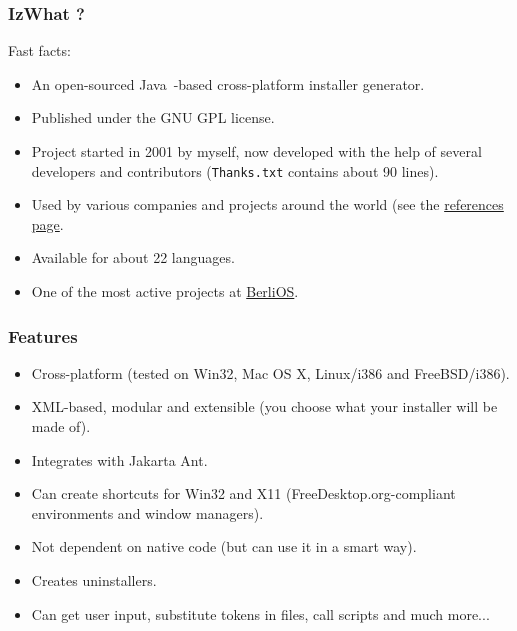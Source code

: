 \documentclass[compress,10pt]{beamer}
\begin{document}
\begin{frame}

\frametitle{IzWhat ?}

Fast facts:
  \begin{itemize}
    \item An open-sourced Java\texttrademark~-based cross-platform installer
    generator.

    \item Published under the GNU GPL license.

    \item Project started in 2001 by myself, now developed with the help of
    several developers and contributors (\texttt{Thanks.txt} contains about 90
    lines).

    \item Used by various companies and projects around the world (see the
    \href{http://izpack.org/references}{references page}.

    \item Available for about 22 languages.

    \item One of the most active projects at
    \href{http://www.berlios.de/}{BerliOS}.
  \end{itemize}

\end{frame}


\begin{frame}

\frametitle{Features}

\begin{itemize}

  \item Cross-platform (tested on Win32, Mac OS X, Linux/i386 and FreeBSD/i386).

  \item XML-based, modular and extensible (you choose what your installer will
  be made of).

  \item Integrates with Jakarta Ant.

  \item Can create shortcuts for Win32 and X11 (FreeDesktop.org-compliant
  environments and window managers).

  \item Not dependent on native code (but can use it in a smart way).

  \item Creates uninstallers.

  \item Can get user input, substitute tokens in files, call scripts and much
  more...

\end{itemize}

\end{frame}
\end{document}
